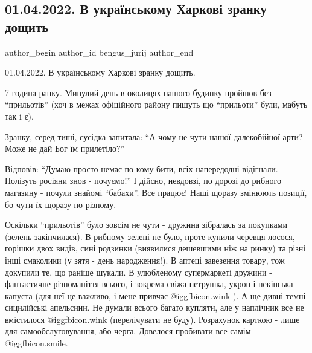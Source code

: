  
 
 
 
 
 
\subsection{01.04.2022. В українському Харкові зранку дощить}
\label{sec:01_04_2022.fb.bengus_jurij.1.ukr_harkov_dosch}
 
\ifcmt
 author_begin
   author_id bengus_jurij
 author_end
\fi

01.04.2022. В українському Харкові зранку дощить. 

7 година ранку. Минулий день в околицях нашого будинку пройшов без \enquote{прильотів}
(хоч в межах офіційного району пишуть що \enquote{прильоти} були, мабуть так і є).

Зранку, серед тиші, сусідка запитала: \enquote{А чому не чути нашої далекобійної арти?
Може не дай Бог їм прилетіло?} 

Відповів: \enquote{Думаю просто немає по кому бити, всіх напередодні відігнали.
Полізуть росіяни знов - почуємо!} І дійсно, невдовзі, по дорозі до рибного
магазину - почули знайомі \enquote{бабахи}. Все працює! Наші щоразу змінюють позиції,
бо чути їх щоразу по-різному. 

Оскільки \enquote{прильотів} було зовсім не чути - дружина зібралась за покупками
(зелень закінчилася). В рибному зелені не було, проте купили черевця лосося,
горішки двох видів, сині родзинки (виявилися дешевшими ніж на ринку) та різні
інші смаколики (у зятя - день народження!). В аптеці завезення товару, тож
докупили те, що раніше шукали. В улюбленому супермаркеті дружини - фантастичне
різноманіття всього, і зокрема свіжа петрушка, укроп і пекінська капуста (для
неї це важливо, і мене привчає  @igg{fbicon.wink} ). А ще дивні темні сицилійські апельсини. Не
думали всього багато купляти, але у наплічник все не вмістилося  @igg{fbicon.wink} 
(перелічувати не буду). Розрахунок карткою - лише для самообслуговування, або
черга. Довелося пробивати все самім  @igg{fbicon.smile}. 

